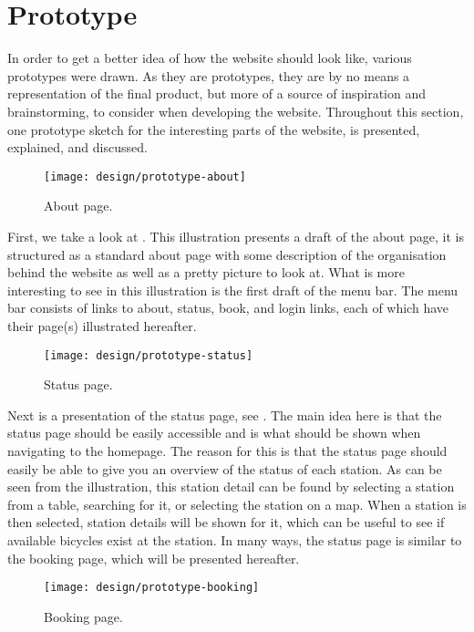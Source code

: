 \section{Prototype}
In order to get a better idea of how the website should look like, various prototypes were drawn.
As they are prototypes, they are by no means a representation of the final product, but more of a source of inspiration and brainstorming, to consider when developing the website.
Throughout this section, one prototype sketch for the interesting parts of the website, is presented, explained, and discussed.

\begin{figure}[h]
	\centering
	\texttt{[image: design/prototype-about]}
	\caption{About page.}\label{fig:prototype-about}
\end{figure}

First, we take a look at .
This illustration presents a draft of the about page, it is structured as a standard about page with some description of the organisation behind the website as well as a pretty picture to look at.
What is more interesting to see in this illustration is the first draft of the menu bar.
The menu bar consists of links to about, status, book, and login links, each of which have their page(s) illustrated hereafter.

\begin{figure}[h]
	\centering
	\texttt{[image: design/prototype-status]}
	\caption{Status page.}\label{fig:prototype-status}
\end{figure}

Next is a presentation of the status page, see .
The main idea here is that the status page should be easily accessible and is what should be shown when navigating to the homepage.
The reason for this is that the status page should easily be able to give you an overview of the status of each station.
As can be seen from the illustration, this station detail can be found by selecting a station from a table, searching for it, or selecting the station on a map.
When a station is then selected, station details will be shown for it, which can be useful to see if available bicycles exist at the station.
In many ways, the status page is similar to the booking page, which will be presented hereafter.

\begin{figure}[h]
	\centering
	\texttt{[image: design/prototype-booking]}
	\caption{Booking page.}\label{fig:prototype-book}
\end{figure}

